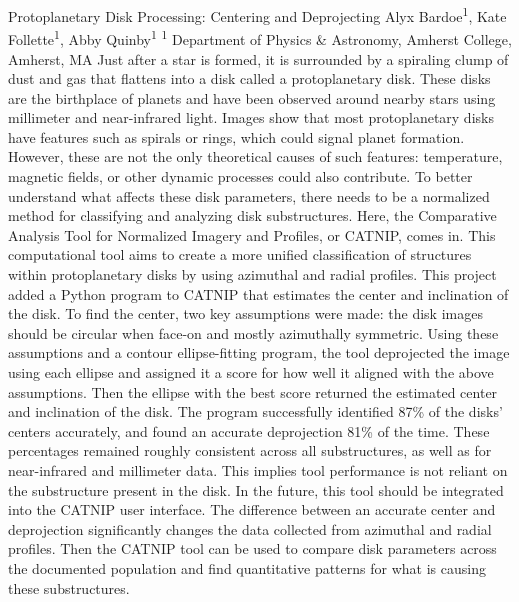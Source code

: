 \makeabstract
    {
    Protoplanetary Disk Processing: Centering and Deprojecting
    }
    {
    Alyx Bardoe\textsuperscript{1}, Kate Follette\textsuperscript{1}, Abby Quinby\textsuperscript{1}
    }
    {
    \textsuperscript{1} Department of Physics \& Astronomy, Amherst College, Amherst, MA
    }
    {
    Just after a star is formed, it is surrounded by a spiraling clump of dust and gas that flattens into a disk called a protoplanetary disk. These disks are the birthplace of planets and have been observed around nearby stars using millimeter and near-infrared light. Images show that most protoplanetary disks have features such as spirals or rings, which could signal planet formation. However, these are not the only theoretical causes of such features: temperature, magnetic fields, or other dynamic processes could also contribute. To better understand what affects these disk parameters, there needs to be a normalized method for classifying and analyzing disk substructures.
    }
    {
    Here, the Comparative Analysis Tool for Normalized Imagery and Profiles, or CATNIP, comes in. This computational tool aims to create a more unified classification of structures within protoplanetary disks by using azimuthal and radial profiles. This project added a Python program to CATNIP that estimates the center and inclination of the disk. To find the center, two key assumptions were made: the disk images should be circular when face-on and mostly azimuthally symmetric. Using these assumptions and a contour ellipse-fitting program, the tool deprojected the image using each ellipse and assigned it a score for how well it aligned with the above assumptions. Then the ellipse with the best score returned the estimated center and inclination of the disk.
    }
    {
    The program successfully identified 87\% of the disks{\textquoteright} centers accurately, and found an accurate deprojection 81\% of the time. These percentages remained roughly consistent across all substructures, as well as for near-infrared and millimeter data. This implies tool performance is not reliant on the substructure present in the disk.
    }
    {
    In the future, this tool should be integrated into the CATNIP user interface. The difference between an accurate center and deprojection significantly changes the data collected from azimuthal and radial profiles. Then the CATNIP tool can be used to compare disk parameters across the documented population and find quantitative patterns for what is causing these substructures.
    }

    \newpage
    